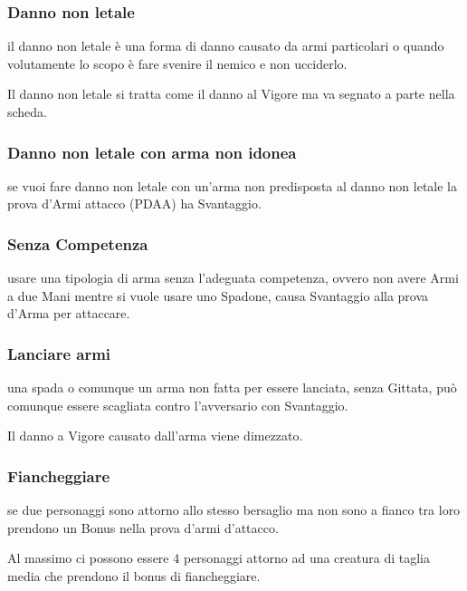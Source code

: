 \documentclass[12pt,a4paper,twoside,openany]{book}
\begin{document}
\begin{multicols}{2}
\subsubsection{Danno non letale}\label{dannononletale}

il danno non letale è una forma di danno causato da armi particolari o quando volutamente lo scopo è fare svenire il nemico e non ucciderlo.

Il danno non letale si tratta come il danno al Vigore ma va segnato a parte nella scheda.

\subsubsection{Danno non letale con arma non idonea} \label{dannononletalearmanonidonea}

se vuoi fare danno non letale con un'arma non predisposta al danno non letale la prova d'Armi attacco (PDAA) ha Svantaggio.

\subsubsection{Senza Competenza}\label{senzacompetenza}

usare una tipologia di arma senza l'adeguata competenza, ovvero non avere Armi a due Mani mentre si vuole usare uno Spadone, causa Svantaggio alla prova d'Arma per attaccare.

\subsubsection{Lanciare armi} \label{lanciarearmi}

una spada o comunque un arma non fatta per essere lanciata, senza Gittata, può comunque essere scagliata contro l'avversario con Svantaggio.

Il danno a Vigore causato dall'arma viene dimezzato.

\subsubsection{Fiancheggiare} \label{fiancheggiare}

se due personaggi sono attorno allo stesso bersaglio ma non sono a fianco tra loro prendono un Bonus nella prova d'armi d'attacco.

Al massimo ci possono essere 4 personaggi attorno ad una creatura di taglia media che prendono il bonus di fiancheggiare.


\end{multicols}
\end{document}
